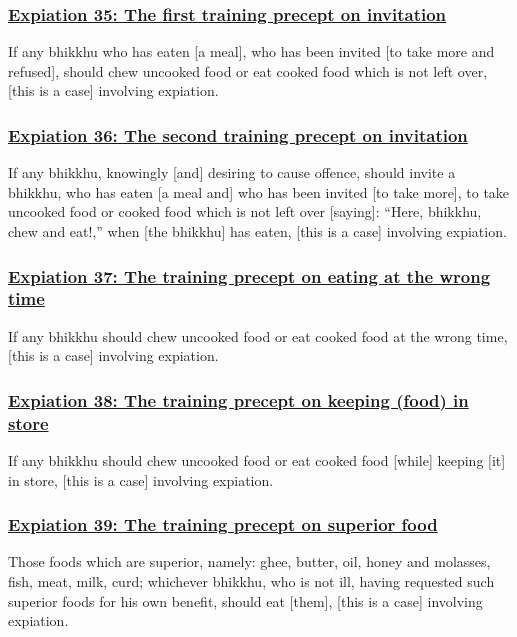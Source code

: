 \subsubsection*{\hyperref[pac35]{Expiation 35: The first training precept on invitation}}
\label{exp35}
If any bhikkhu who has eaten [a meal], who has been invited [to take more and refused], should chew uncooked food or eat cooked food which is not left over, [this is a case] involving expiation.



\subsubsection*{\hyperref[pac36]{Expiation 36: The second training precept on invitation}}
\label{exp36}
If any bhikkhu, knowingly [and] desiring to cause offence, should invite a bhikkhu, who has eaten [a meal and] who has been invited [to take more], to take uncooked food or cooked food which is not left over [saying]: ``Here, bhikkhu, chew and eat!,'' when [the bhikkhu] has eaten, [this is a case] involving expiation.



\subsubsection*{\hyperref[pac37]{Expiation 37: The training precept on eating at the wrong time}}
\label{exp37}
If any bhikkhu should chew uncooked food or eat cooked food at the wrong time, [this is a case] involving expiation.



\subsubsection*{\hyperref[pac38]{Expiation 38: The training precept on keeping (food) in store}}
\label{exp38}
If any bhikkhu should chew uncooked food or eat cooked food [while] keeping [it] in store, [this is a case] involving expiation.



\subsubsection*{\hyperref[pac39]{Expiation 39: The training precept on superior food}}
\label{exp39}
Those foods which are superior, namely: ghee, butter, oil, honey and molasses, fish, meat, milk, curd; whichever bhikkhu, who is not ill, having requested such superior foods for his own benefit, should eat [them], [this is a case] involving expiation.




